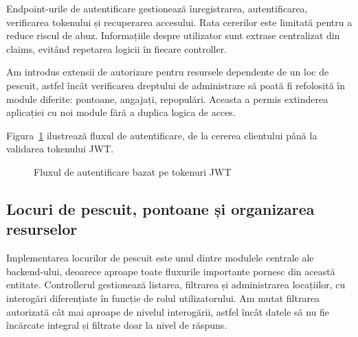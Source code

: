 Endpoint-urile de autentificare gestionează înregistrarea, autentificarea, verificarea tokenului și recuperarea accesului. Rata cererilor este limitată pentru a reduce riscul de abuz. Informațiile despre utilizator sunt extrase centralizat din claims, evitând repetarea logicii în fiecare controller.

Am introdus extensii de autorizare pentru resursele dependente de un loc de pescuit, astfel încât verificarea dreptului de administrare să poată fi refolosită în module diferite: pontoane, angajați, repopulări. Aceasta a permis extinderea aplicației cu noi module fără a duplica logica de acces.

Figura~\ref{fig:flux-autentificare} ilustrează fluxul de autentificare, de la cererea clientului până la validarea tokenului JWT.

\begin{figure}[H]
\centering
{}
\caption{Fluxul de autentificare bazat pe tokenuri JWT}
\label{fig:flux-autentificare}
\end{figure}

\subsection{Locuri de pescuit, pontoane și organizarea resurselor}

Implementarea locurilor de pescuit este unul dintre modulele centrale ale backend-ului, deoarece aproape toate fluxurile importante pornesc din această entitate. Controllerul gestionează listarea, filtrarea și administrarea locațiilor, cu interogări diferențiate în funcție de rolul utilizatorului. Am mutat filtrarea autorizată cât mai aproape de nivelul interogării, astfel încât datele să nu fie încărcate integral și filtrate doar la nivel de răspuns.

